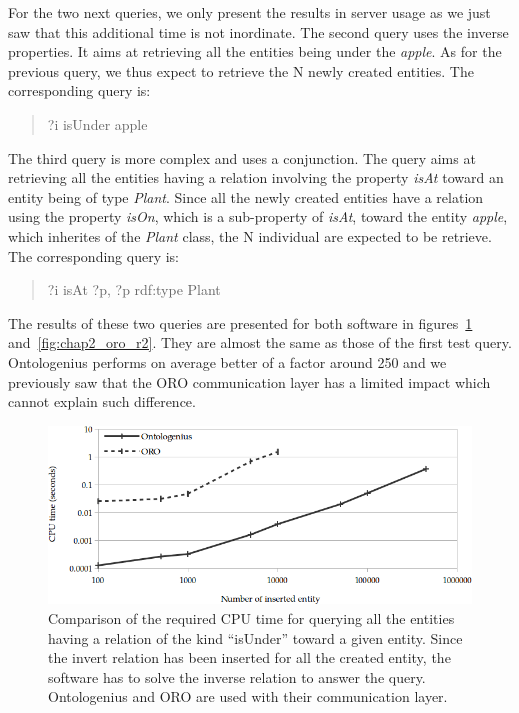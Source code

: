 For the two next queries, we only present the results in server usage as we just saw that this additional time is not inordinate. The second query uses the inverse properties. It aims at retrieving all the entities being under the \textit{apple}. As for the previous query, we thus expect to retrieve the N newly created entities. The corresponding \sparql{} query is:

\begin{quote} 
\centering 
?i isUnder apple
\end{quote}

The third query is more complex and uses a conjunction. The query aims at retrieving all the entities having a relation involving the property \textit{isAt} toward an entity being of type \textit{Plant}. Since all the newly created entities have a relation using the property \textit{isOn}, which is a sub-property of \textit{isAt}, toward the entity \textit{apple}, which inherites of the \textit{Plant} class, the N individual are expected to be retrieve. The corresponding \sparql{} query is:

\begin{quote} 
\centering 
?i isAt ?p, ?p rdf:type Plant
\end{quote}

The results of these two queries are presented for both software in figures~\ref{fig:chap2_oro_r3} and~\ref{fig:chap2_oro_r2}. They are almost the same as those of the first test query. Ontologenius performs on average better of a factor around 250 and we previously saw that the ORO communication layer has a limited impact which cannot explain such difference.

\begin{figure}[ht!]
\centering
\includegraphics[width=\textwidth]{figures/chapter2/oro/R3.png}
\caption{\label{fig:chap2_oro_r3} Comparison of the required CPU time for querying all the entities having a relation of the kind ``isUnder'' toward a given entity. Since the invert relation has been inserted for all the created entity, the software has to solve the inverse relation to answer the query. Ontologenius and ORO are used with their communication layer.}
\end{figure}

